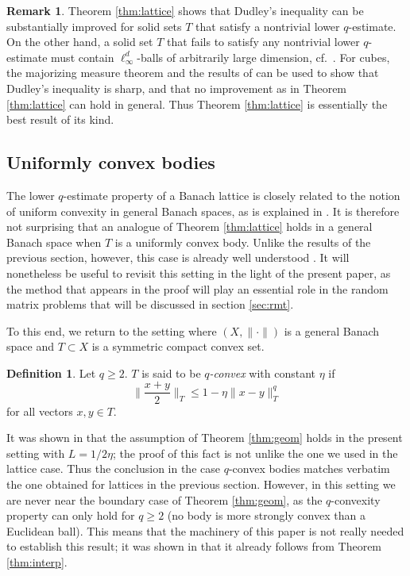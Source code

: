 \documentclass[10pt,reqno]{amsart}
\theoremstyle{definition}
\newtheorem{defn}[thm]{Definition}
\newtheorem{rem}[thm]{Remark}
\numberwithin{equation}{section}
\numberwithin{figure}{section}
\numberwithin{table}{section}
\begin{document}
\begin{rem}
Theorem \ref{thm:lattice} shows that Dudley's inequality can be 
substantially improved for solid sets $T$ that satisfy a nontrivial 
lower $q$-estimate. On the other hand, a solid set $T$ that fails to 
satisfy any nontrivial lower $q$-estimate must contain 
$\ell_\infty^d$-balls of arbitrarily large dimension, cf.\ \cite[Theorem 
1.f.12]{LT79}. For cubes, the majorizing measure theorem and the 
results of \cite{Car81} can be used to show that Dudley's inequality is 
sharp, and that no improvement as in Theorem \ref{thm:lattice} 
can hold in general. Thus Theorem \ref{thm:lattice} is essentially the 
best result of its kind.
\end{rem}


\subsection{Uniformly convex bodies}
\label{sec:unifc}

The lower $q$-estimate property of a Banach lattice is closely related to 
the notion of uniform convexity in general Banach spaces, as is explained 
in \cite[section 1.f]{LT79}. It is therefore not surprising that an 
analogue of Theorem \ref{thm:lattice} holds in a general Banach space when 
$T$ is a uniformly convex body. Unlike the results of the previous 
section, however, this case is already well understood 
\cite[section 4.1]{Tal14}. It will nonetheless be useful to revisit this 
setting in the light of the present paper, as the method that appears in 
the proof will play an essential role in the random matrix problems that 
will be discussed in section \ref{sec:rmt}.

To this end, we return to the setting where $(X,\|\cdot\|)$ is a general 
Banach space and $T\subset X$ is a symmetric compact convex set.

\begin{defn}
\label{defn:ucvx}
Let $q\ge 2$. $T$ is said to be \emph{$q$-convex} with constant $\eta$ if
$$
	\bigg\|\frac{x+y}{2}\bigg\|_T \le 1-\eta\|x-y\|_T^q
$$
for all vectors $x,y\in T$.
\end{defn}

It was shown in \cite[Lemma 4.7]{vH16a} that the assumption of Theorem 
\ref{thm:geom} holds in the present setting with $L=1/2\eta$; the proof of 
this fact is not unlike the one we used in the lattice case. Thus the 
conclusion in the case $q$-convex bodies matches verbatim the one obtained 
for lattices in the previous section. However, in this setting we 
are never near the boundary case of Theorem \ref{thm:geom}, as the 
$q$-convexity property can only hold for $q\ge 2$ (no body is 
more strongly convex than a Euclidean ball).  This means that the 
machinery of this paper is not really needed to establish this result;
it was shown in \cite{vH16a} that it already follows from Theorem 
\ref{thm:interp}.
\end{document}
